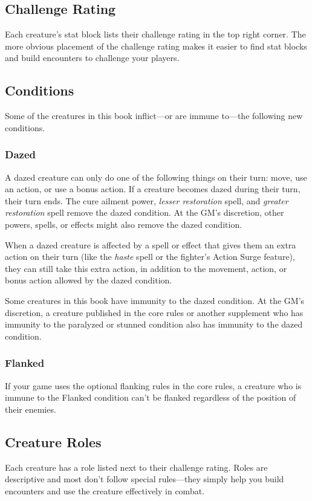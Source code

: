 \documentclass[10pt,a4paper,twoside,bg=print,twocolumn,openany,nodeprecatedcode]{dndbook}
\begin{document}
\subsection{Challenge Rating}
Each creature's stat block lists their challenge rating in the top right corner. The more obvious placement of the challenge rating makes it easier to find stat blocks and build encounters to challenge your players.

\subsection{Conditions}
Some of the creatures in this book inflict—or are immune to—the following new conditions.

\subsubsection{Dazed}
A dazed creature can only do one of the following things on their turn: move, use an action, or use a bonus action. If a creature becomes dazed during their turn, their turn ends. The cure ailment power, \textit{lesser restoration} spell, and \textit{greater restoration} spell remove the dazed condition. At the GM's discretion, other powers, spells, or effects might also remove the dazed condition.

When a dazed creature is affected by a spell or effect that gives them an extra action on their turn (like the \textit{haste} spell or the fighter's Action Surge feature), they can still take this extra action, in addition to the movement, action, or bonus action allowed by the dazed condition.

Some creatures in this book have immunity to the dazed condition. At the GM's discretion, a creature published in the core rules or another supplement who has immunity to the paralyzed or stunned condition also has immunity to the dazed condition.

\subsubsection{Flanked}
If your game uses the optional flanking rules in the core rules, a creature who is immune to the Flanked condition can't be flanked regardless of the position of their enemies.

\subsection{Creature Roles}
Each creature has a role listed next to their challenge rating. Roles are descriptive and most don't follow special rules—they simply help you build encounters and use the creature effectively in combat.
\end{document}

